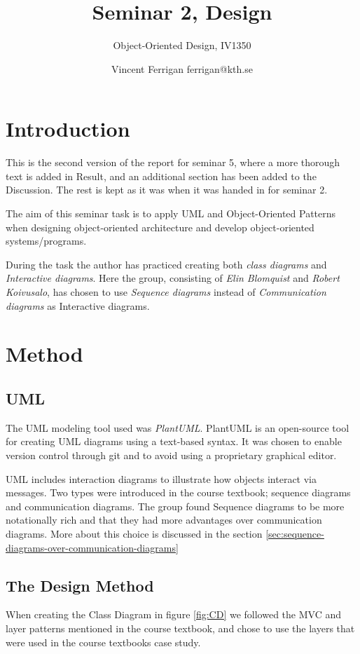 \documentclass[a4paper]{scrreprt}
\title{Seminar 2, Design}
\subtitle{Object-Oriented Design, IV1350}
\author{Vincent Ferrigan ferrigan@kth.se}
\begin{document}
\maketitle

\tableofcontents %

\chapter{Introduction}

This is the second version of the report for seminar 5, where a more thorough text
is added in Result, and an additional section has been added to the Discussion.
The rest is kept as it was when it was handed in for seminar 2.

The aim of this seminar task is to apply UML and Object-Oriented Patterns when
designing object-oriented architecture and develop object-oriented
systems/programs.

During the task the author has practiced creating both \emph{class diagrams} and
\emph{Interactive diagrams}.
Here the group, consisting of \emph{Elin Blomquist} and \emph{Robert Koivusalo},
has chosen to use \emph{Sequence diagrams} instead of \emph{Communication diagrams}
as Interactive diagrams.

\chapter{Method}
\section{UML}
The UML modeling tool used was \emph{PlantUML}.
PlantUML is an open-source tool for creating UML diagrams using a text-based
syntax.
It was chosen to enable version control through git and to avoid using a
proprietary graphical editor.

UML includes interaction diagrams to illustrate how objects interact via messages.
Two types were introduced in the course textbook; sequence diagrams and communication diagrams.
The group found Sequence diagrams to be more notationally rich and that they had more advantages
over communication diagrams.
More about this choice is discussed in the section \ref{sec:sequence-diagrams-over-communication-diagrams}

\section{The Design Method}
When creating the Class Diagram in figure \ref{fig:CD} we followed the MVC and layer patterns
mentioned in the course textbook,
and chose to use the layers that were used in the course textbooks case study.
\end{document}
